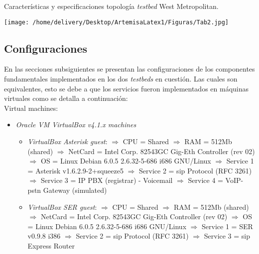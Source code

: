 \documentclass[a4paper,12pt]{report}
\begin{document}
\begin{table}%
\caption{Características y especificaciones topología \emph{testbed} West Metropolitan.}
\centering
\texttt{[image: /home/delivery/Desktop/ArtemisaLatex1/Figuras/Tab2.jpg]}
\label{testbed_metropolitan_tabla}
\end{table}


\subsection{Configuraciones}
En las secciones subsiguientes se presentan las configuraciones de los
componentes fundamentales implementados en los dos \emph{testbeds} en
cuestión. Las cuales son equivalentes, esto se debe a que los servicios fueron
implementados en máquinas virtuales como se detalla a continuación:\\

Virtual machines:
\begin{itemize}
    \item \emph{Oracle VM VirtualBox v4.1.x machines}
    \begin{itemize}
     \item \emph{VirtualBox Asterisk guest}:
	\subitem $\Rightarrow$ CPU = Shared
	\subitem $\Rightarrow$ RAM = 512Mb (shared)
	\subitem $\Rightarrow$ NetCard = Intel Corp. 82543GC Gig-Eth
Controller (rev 02)
	\subitem $\Rightarrow$ OS = Linux Debian 6.0.5 2.6.32-5-686 i686 GNU/Linux
	\subitem $\Rightarrow$ Service 1 = Asterisk v1.6.2.9-2+squeeze5
	\subitem $\Rightarrow$ Service 2 = \ac{sip} Protocol (RFC 3261)
	\subitem $\Rightarrow$ Service 3 = IP PBX (registrar) - Voicemail
	\subitem $\Rightarrow$ Service 4 = VoIP-\ac{pstn} Gateway (simulated)
    \item \emph{VirtualBox SER guest}:
	\subitem $\Rightarrow$ CPU = Shared
	\subitem $\Rightarrow$ RAM = 512Mb (shared)
	\subitem $\Rightarrow$ NetCard = Intel Corp. 82543GC Gig-Eth
Controller (rev 02)
	\subitem $\Rightarrow$ OS = Linux Debian 6.0.5 2.6.32-5-686 i686 GNU/Linux
	\subitem $\Rightarrow$ Service 1 = SER v0.9.8 i386
	\subitem $\Rightarrow$ Service 2 = \ac{sip} Protocol (RFC 3261)
	\subitem $\Rightarrow$ Service 3 = \ac{sip} Express Router
  \end{itemize}
\end{itemize}
\end{document}
